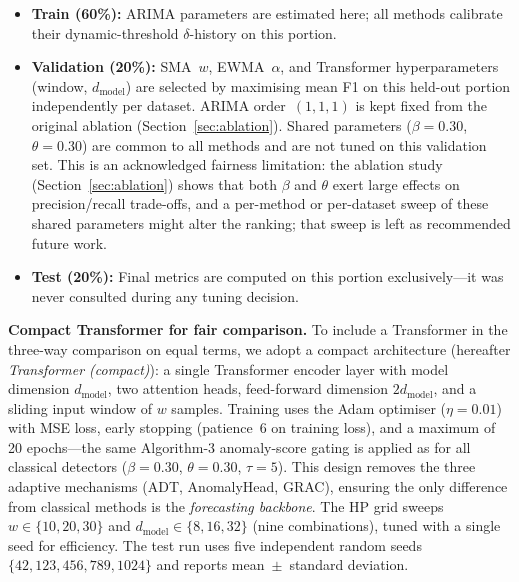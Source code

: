 \documentclass[pdflatex,sn-nature]{sn-jnl}
\theoremstyle{thmstyleone}%
\begin{document}
\begin{itemize}
  \item \textbf{Train (60\%):} ARIMA parameters are estimated here; all methods
    calibrate their dynamic-threshold $\delta$-history on this portion.
  \item \textbf{Validation (20\%):} SMA~$w$, EWMA~$\alpha$, and Transformer
    hyperparameters (window, $d_{\text{model}}$) are selected by maximising
    mean F1 on this held-out portion independently per dataset.
    ARIMA order~$(1,1,1)$ is kept fixed from the original ablation
    (Section~\ref{sec:ablation}).
    Shared parameters ($\beta=0.30$, $\theta=0.30$) are common to all methods
    and are not tuned on this validation set.
    This is an acknowledged fairness limitation: the ablation study
    (Section~\ref{sec:ablation}) shows that both $\beta$ and $\theta$ exert
    large effects on precision/recall trade-offs, and a per-method or
    per-dataset sweep of these shared parameters might alter the ranking;
    that sweep is left as recommended future work.
  \item \textbf{Test (20\%):} Final metrics are computed on this portion
    exclusively---it was never consulted during any tuning decision.
\end{itemize}

\textbf{Compact Transformer for fair comparison.}
To include a Transformer in the three-way comparison on equal terms, we adopt
a compact architecture (hereafter \emph{Transformer (compact)}):
a single Transformer encoder layer with model dimension $d_{\text{model}}$,
two attention heads, feed-forward dimension $2 d_{\text{model}}$, and a
sliding input window of $w$ samples.
Training uses the Adam optimiser ($\eta=0.01$) with MSE loss, early stopping
(patience~6 on training loss), and a maximum of 20 epochs---the same
Algorithm-3 anomaly-score gating is applied as for all classical detectors
($\beta=0.30$, $\theta=0.30$, $\tau=5$).
This design removes the three adaptive mechanisms (ADT, AnomalyHead, GRAC),
ensuring the only difference from classical methods is the
\emph{forecasting backbone}.
The HP grid sweeps $w \in \{10, 20, 30\}$ and $d_{\text{model}} \in \{8, 16, 32\}$
(nine combinations), tuned with a single seed for efficiency.
The test run uses five independent random seeds $\{42, 123, 456, 789, 1024\}$
and reports mean~$\pm$~standard deviation.
\end{document}
